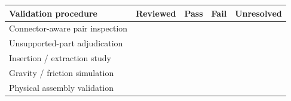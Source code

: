 \begin{tabular}{lrrrr}
\toprule
Validation procedure & Reviewed & Pass & Fail & Unresolved\\\midrule
Connector-aware pair inspection &  &  &  & \\
Unsupported-part adjudication &  &  &  & \\
Insertion / extraction study &  &  &  & \\
Gravity / friction simulation &  &  &  & \\
Physical assembly validation &  &  &  & \\
\bottomrule
\end{tabular}
